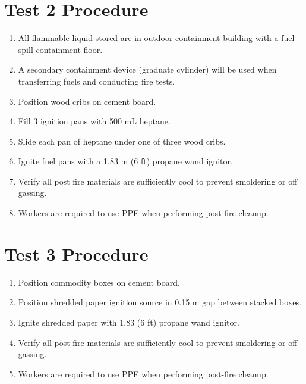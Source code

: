 \documentclass[12pt,oneside]{book}
\begin{document}
\section{Test 2 Procedure}
\label{procedure2}
\begin{enumerate}
  \item All flammable liquid stored are in outdoor containment building with a fuel spill containment floor. 
  \item A secondary containment device (graduate cylinder) will be used when transferring fuels and conducting fire tests.
  \item Position wood cribs on cement board.
  \item Fill 3 ignition pans with 500 mL heptane.
  \item Slide each pan of heptane under one of three wood cribs. 
  \item Ignite fuel pans with a 1.83 m (6 ft) propane wand ignitor.
  \item Verify all post fire materials are sufficiently cool to prevent smoldering or off gassing.
  \item Workers are required to use PPE when performing post-fire cleanup.

\end{enumerate}

\section{Test 3 Procedure}
\label{procedure3}
\begin{enumerate}
  \item Position commodity boxes on cement board.
  \item Position shredded paper ignition source in 0.15 m gap between stacked boxes.
  \item Ignite shredded paper with 1.83 (6 ft) propane wand ignitor.
  \item Verify all post fire materials are sufficiently cool to prevent smoldering or off gassing.
  \item Workers are required to use PPE when performing post-fire cleanup.
\end{enumerate}
\end{document}
